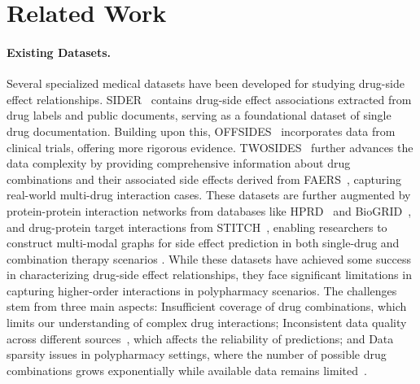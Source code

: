 \section{Related Work}
\label{sec:related}
\paragraph{Existing Datasets.} Several specialized medical datasets have been developed for studying drug-side effect relationships. SIDER~\cite{kuhn2010side,kuhn2016sider} contains drug-side effect associations extracted from drug labels and public documents, serving as a foundational dataset of single drug documentation. Building upon this, OFFSIDES~\cite{kumar2024predicting} incorporates data from clinical trials, offering more rigorous evidence. TWOSIDES~\cite{tatonetti2012data} further advances the data complexity by providing comprehensive information about drug combinations and their associated side effects derived from FAERS~\cite{fda_faers,faers_technical}, capturing real-world multi-drug interaction cases. These datasets are further augmented by protein-protein interaction networks from databases like HPRD~\cite{keshava2009human} and BioGRID~\cite{stark2006biogrid}, and drug-protein target interactions from STITCH~\cite{kuhn2007stitch}, enabling researchers to construct multi-modal graphs for side effect prediction in both single-drug and combination therapy scenarios \cite{zitnik2018modeling, wang2009pubchem, ryu2018deep, vilar2017role}. While these datasets have achieved some success in characterizing drug-side effect relationships, they face significant limitations in capturing higher-order interactions in polypharmacy scenarios. The challenges stem from three main aspects:  Insufficient coverage of drug combinations, which limits our understanding of complex drug interactions;  Inconsistent data quality across different sources~\cite{ismail2022fda}, which affects the reliability of predictions; and  Data sparsity issues in polypharmacy settings, where the number of possible drug combinations grows exponentially while available data remains limited~\cite{tekin2017measuring,tekin2018prevalence}.


